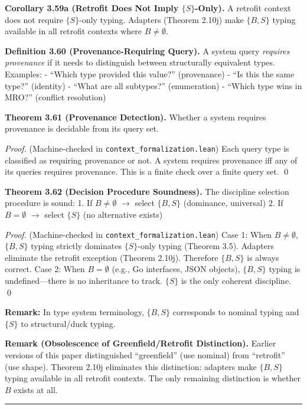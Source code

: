 \textbf{Corollary 3.59a (Retrofit Does Not Imply $\{S\}$-Only).} A
retrofit context does not require $\{S\}$-only typing. Adapters (Theorem
2.10j) make $\{B,S\}$ typing available in all retrofit contexts where
\(B \neq \emptyset\).

\textbf{Definition 3.60 (Provenance-Requiring Query).} A system query
\emph{requires provenance} if it needs to distinguish between
structurally equivalent types. Examples: - ``Which type provided this
value?'' (provenance) - ``Is this the same type?'' (identity) - ``What
are all subtypes?'' (enumeration) - ``Which type wins in MRO?''
(conflict resolution)

\textbf{Theorem 3.61 (Provenance Detection).} Whether a system requires
provenance is decidable from its query set.

\emph{Proof.} (Machine-checked in \texttt{context\_formalization.lean})
Each query type is classified as requiring provenance or not. A system
requires provenance iff any of its queries requires provenance. This is
a finite check over a finite query set. \qed

\textbf{Theorem 3.62 (Decision Procedure Soundness).} The discipline
selection procedure is sound: 1. If \(B \neq \emptyset\) $\rightarrow$ select
$\{B,S\}$ (dominance, universal) 2. If \(B = \emptyset\) $\rightarrow$ select $\{S\}$
(no alternative exists)

\emph{Proof.} (Machine-checked in \texttt{context\_formalization.lean})
Case 1: When \(B \neq \emptyset\), $\{B,S\}$ typing strictly dominates
$\{S\}$-only typing (Theorem 3.5). Adapters eliminate the retrofit
exception (Theorem 2.10j). Therefore $\{B,S\}$ is always correct. Case 2:
When \(B = \emptyset\) (e.g., Go interfaces, JSON objects), $\{B,S\}$
typing is undefined---there is no inheritance to track. $\{S\}$ is the
only coherent discipline. \qed

\textbf{Remark:} In type system terminology, $\{B,S\}$ corresponds to nominal typing and $\{S\}$ to structural/duck typing.

\textbf{Remark (Obsolescence of Greenfield/Retrofit Distinction).}
Earlier versions of this paper distinguished ``greenfield'' (use
nominal) from ``retrofit'' (use shape). Theorem 2.10j eliminates this
distinction: adapters make $\{B,S\}$ typing available in all retrofit
contexts. The only remaining distinction is whether \(B\) exists at all.

\begin{center}\rule{0.5\linewidth}{0.5pt}\end{center}

